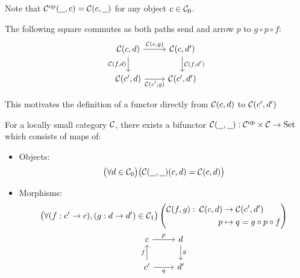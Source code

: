 \begin{remark}\label{rmk:op_hom_functor}
  Note that $\mathcal{C}^{\mathrm{op}}(\underline{\ \ }, c) = \mathcal{C}(c, \underline{\ \ })$ for any object $c\in\mathcal{C}_0$.
\end{remark}

\begin{remark}
  The following square commutes as both paths send and arrow $p$ to $g\circ
  p\circ f$:
  \[\begin{tikzcd}[ampersand replacement=\&]
    {\C(c,d)} \& {\C(c,d')} \\
    {\C(c', d)} \& {\C(c',d')}
    \arrow["{\C(c,g)}", from=1-1, to=1-2]
    \arrow["{\C(f,d)}"', from=1-1, to=2-1]
    \arrow["{\C(c', g)}"', from=2-1, to=2-2]
    \arrow["{\C(f,d')}", from=1-2, to=2-2]
  \end{tikzcd}\]

  This motivates the definition of a functor directly from $\mathcal{C}(c, d)$ to
  $\mathcal{C}(c',d')$
\end{remark}

\begin{definition}
  For a locally small category $\mathcal{C}$, there exists a bifunctor $\mathcal{C}(\underline{\ \ }, \underline{\ \ })
  : \mathcal{C}^{\mathrm{op}} \times \mathcal{C} \to \mathrm{Set}$ which consists of maps of:
  \parencite{leinster:basic_category_theory}
  \begin{itemize}
    \item Objects:
      \[\big(\forall d \in \mathcal{C}_0\big)
        \big(\mathcal{C}(\underline{\ \ }, \underline{\ \ })(c,d) = \mathcal{C}(c, d)\big)\]
    \item Morphisms:
      \[
        \begin{gathered}
          \big(\forall (f:c'\to c),(g: d\to d')\in \C_1\big)
          \left(
            \begin{aligned}
              \C(f, g):&&\!\!\! \C(c, d) &\to \C(c', d')\\
              &&p &\mapsto q = g\circ p \circ f
            \end{aligned}
          \right)\\
          \begin{tikzcd}[ampersand replacement=\&]
            c \& d \\
            {c'} \& {d'}
            \arrow["f", from=2-1, to=1-1]
            \arrow["g", from=1-2, to=2-2]
            \arrow["p", from=1-1, to=1-2]
            \arrow["q"', from=2-1, to=2-2]
          \end{tikzcd}
        \end{gathered}
      \]
  \end{itemize}
\end{definition}